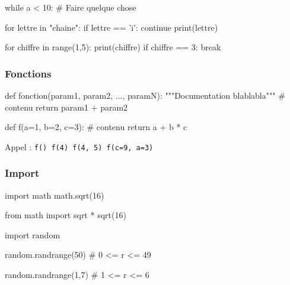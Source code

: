 \documentclass{beamer}
\let\oldsubsubsection\subsubsection
\renewcommand{\subsubsection}[2][]{\def\currentsubsubsection{#2}\oldsubsubsection[#1]{#2}}
\begin{document}
\begin{code}{\codeboxa}
while a < 10:
    # Faire quelque chose
\end{code}
\begin{code}{\codeboxb}
for lettre in "chaine":
    if lettre == 'i':
        continue
    print(lettre)
\end{code}
\begin{code}{\codeboxc}
for chiffre in range(1,5):
    print(chiffre)
    if chiffre == 3:
        break
\end{code}
\begin{frame}
  \begin{overprint}
    \usebox\codeboxa
    \usebox\codeboxb
    \usebox\codeboxc
  \end{overprint}
\end{frame}

\subsubsection{Fonctions}

\begin{code}{\codebox}
def fonction(param1, param2, ..., paramN):
    """Documentation
    blablabla"""
    # contenu
    return param1 + param2
\end{code}

\begin{frame}
  \usebox\codebox
\end{frame}

\begin{code}{\codebox}
def f(a=1, b=2, c=3):
    # contenu
    return a + b * c
\end{code}
\begin{frame}
  \usebox\codebox
  
  Appel : \lstinline{f() f(4) f(4, 5) f(c=9, a=3)}
\end{frame}

\subsubsection{Import}
\begin{code}{\codeboxa}
import math
math.sqrt(16)
  
from math import sqrt
                 *
sqrt(16)
\end{code}
\begin{code}{\codeboxb}
import random
  
random.randrange(50) # 0 <= r <= 49

random.randrange(1,7) # 1 <= r <= 6
\end{code}
\begin{frame}
  \begin{overprint}
    \usebox\codeboxa
    \usebox\codeboxb
  \end{overprint}
\end{frame}
\end{document}
